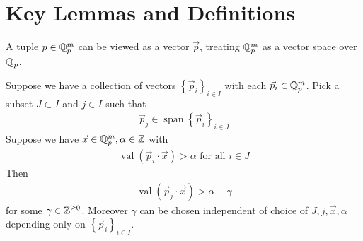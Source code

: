 \documentclass{amsart}
\newcommand{\curly}[1]{\left\{#1\right\}}
\DeclareMathOperator{\vecspan}{span}
\DeclareMathOperator{\val}{val}
\begin{document}


\section{Key Lemmas and Definitions}

\begin{Definition}
	A tuple $p \in  \mathbb{Q}_p^m$ can be viewed as a vector $\vec p$, treating $\mathbb{Q}_p^m$ as a vector space over $\mathbb{Q}_p$.
\end{Definition}

\begin{Lemma}	
	Suppose we have a collection of vectors $\curly{\vec p_i}_{i \in I}$ with each $\vec p_i \in \mathbb{Q}_p^m$.
	Pick a subset $J \subset I$ and $j \in I$ such that
	\begin{align*}
		\vec p_j \in \vecspan \curly{\vec p_i}_{i \in J} 
	\end{align*}
	Suppose we have $\vec x \in \mathbb{Q}_p^m, \alpha \in \mathbb{Z}$ with
	\begin{align*}
		\val(\vec p_i \cdot \vec x) > \alpha \text{ for all } i \in J
	\end{align*}
	Then
	\begin{align*}
		\val(\vec p_j \cdot \vec x) > \alpha - \gamma
	\end{align*}
	for some $\gamma \in \mathbb{Z}^{\geq 0}$.
	Moreover $\gamma$ can be chosen independent of choice of $J, j, \vec x, \alpha$ depending only on $\curly{\vec p_i}_{i \in I}$.
\end{Lemma}
\end{document}
